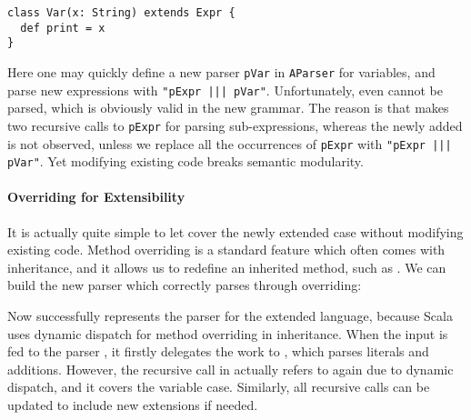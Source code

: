 \vspace{-4pt}
\begin{lstlisting}
class Var(x: String) extends Expr {
  def print = x
}
\end{lstlisting}
\vspace{-4pt}

Here one may quickly define a new parser \lstinline|pVar| in \lstinline|AParser| for variables, and parse new expressions
with \lstinline{"pExpr ||| pVar"}.
Unfortunately, even  cannot be parsed, which is obviously valid in the new grammar.
The reason is that  makes two recursive calls to \lstinline|pExpr| for parsing sub-expressions, whereas the newly added  is not observed, unless we replace all the occurrences of \lstinline|pExpr| with \lstinline{"pExpr ||| pVar"}.
Yet modifying existing code breaks semantic modularity.

\vspace{-.05in}
\paragraph{Overriding for Extensibility}
It is actually quite simple to let  cover the newly
extended case without modifying existing code. Method overriding is a
standard feature which often comes with inheritance, and it allows us
to redefine an inherited method, such as . We can
build the new parser which correctly parses 
through overriding:

\vspace{-4pt}
\vspace{-4pt}

Now  successfully represents the parser for the extended language, because Scala uses dynamic dispatch for
method overriding in inheritance. When the input  is fed to the parser , it firstly delegates
the work to , which parses literals and additions. However, the recursive call  in 
actually refers to  again due to dynamic dispatch, and it covers the variable case. Similarly, all recursive calls can be updated to include new extensions if needed.

\vspace{-.05in}
